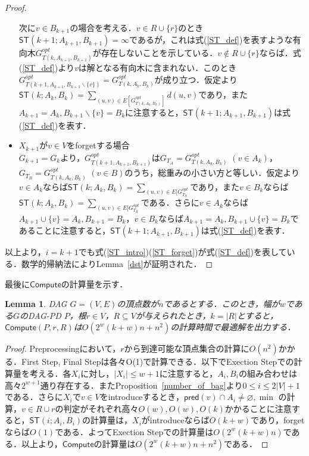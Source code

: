 \documentclass[master]{kuisthesis}		%
\theoremstyle{plain}
\newtheorem{lemma}{Lemma}
\theoremstyle{definition}
\begin{document}
\begin{proof}
\begin{itemize}
        次に$v \in B_{k+1}$の場合を考える．$v \in R \cup \{r\}$のとき$\mathsf{ST}(k+1; A_{k+1}, B_{k+1}) = \infty$であるが，これは式(\ref{ST_def})を表すような有向木$G^{opt}_{T(k, A_{k+1}, B_{k+1})}$が存在しないことを示している．$v \notin R \cup \{r\}$ならば．式(\ref{ST_def})より$v$は解となる有向木に含まれない．このとき$G^{opt}_{T(k+1, A_{k+1}, B_{k+1} \backslash \{v\})} = G^{opt}_{T(k, A_k, B_k)}$が成り立つ．仮定より$\mathsf{ST}(k; A_k, B_k) = \sum_{(u, v) \in E[G^{opt}_{T(k, A_k, B_k)}]} d(u, v)$であり，また$A_{k+1} = A_k, B_{k+1} \backslash \{v\} = B_k$に注意すると，$\mathsf{ST}(k+1; A_{k+1}, B_{k+1})$は式(\ref{ST_def})を表す．
        
        \item $X_{k+1}$が$v \in V$をforgetする場合 \\
        $G_{k+1} = G_k$より，$G^{opt}_{T(k+1, A_{k+1}, B_{k+1})}$は$G_{T_A} = G^{opt}_{T(k, A_k, B_k)}$ $(v \in A_k)$，$G_{T_B} = G^{opt}_{T(k, A_k, B_k)}$ $(v \in B)$のうち，総重みの小さい方と等しい．仮定より$v \in A_k$ならば$\mathsf{ST}(k; A_k, B_k) = \sum_{(u, v) \in E[G^{opt}_{T_A}}$であり，また$v \in B_k$ならば$\mathsf{ST}(k; A_k, B_k) = \sum_{(u, v) \in E[G^{opt}_{T_B}}$である．さらに$v \in A_k$ならば$A_{k+1} \cup \{v\} = A_k, B_{k+1} = B_k$，$v \in B_k$ならば$A_{k+1} = A_k, B_{k+1} \cup \{v\} = B_k$であることに注意すると，$\mathsf{ST}(k+1; A_{k+1}, B_{k+1})$は式(\ref{ST_def})を表す．
    \end{itemize}
    以上より，$i = k+1$でも式(\ref{ST_intro})(\ref{ST_forget})が式(\ref{ST_def})を表している．数学的帰納法によりLemma~\ref{dst}が証明された．
\end{proof}




最後に$\mathsf{Compute}$の計算量を示す．

\begin{lemma}
    DAG $G = (V, E)$の頂点数が$n$であるとする．このとき，幅が$w$である$G$のDAG-PD $P$，根$r \in V$，$R \subseteq V$が与えられたとき，$k = |R|$とすると，$\mathsf{Compute}(P, r, R)$は$O(2^w(k+w)n + n^2)$の計算時間で最適解を出力する．
\end{lemma}

\begin{proof}
    Preprocessingにおいて，$r$から到達可能な頂点集合の計算に$O(n^2)$かかる．First Step, Final Stepは各々O(1)で計算できる．以下でExection Stepでの計算量を考える．各$X_i$に対し，$|X_i| \leq w + 1$に注意すると，$A_i, B_i$の組み合わせは高々$2^{w+1}$通り存在する．またProposition~\ref{number_of_bag}より$0 \leq i \leq 2|V|+1$である．さらに$X_i$で$v \in V$をintroduceするとき，$\mathsf{pred}(v) \cap A_i \neq \varnothing, \min$ の計算，$v \in R \cup {r}$の判定がそれぞれ高々$O(w), O(w), O(k)$かかることに注意すると，$\mathsf{ST}(i; A_i, B_i)$の計算量は，$X_i$がintroduceならば$O(k+w)$であり，forgetならば$O(1)$である．よってExection Stepでの計算量は$O(2^w(k+w)n)$である．以上より，$\mathsf{Compute}$の計算量は$O(2^w(k+w)n + n^2)$である．
\end{proof}
\end{document}
